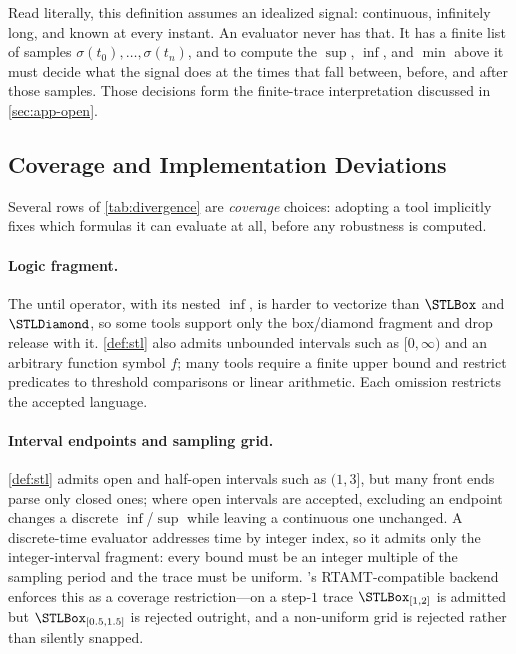 Read literally, this definition assumes an idealized signal: continuous,
infinitely long, and known at every instant. An evaluator never has that. It
has a finite list of samples $\sigma(t_0), \dots, \sigma(t_n)$, and to compute the
$\sup$, $\inf$, and $\min$ above it must decide what the signal does at the
times that fall between, before, and after those samples. Those decisions
form the finite-trace interpretation discussed in \cref{sec:app-open}.

\subsection{Coverage and Implementation Deviations}
\label{sec:app-corner}

Several rows of \cref{tab:divergence} are \emph{coverage} choices: adopting a
tool implicitly fixes which formulas it can evaluate at all, before any
robustness is computed.

\paragraph{Logic fragment.}
The until operator, with its nested $\inf$, is harder to vectorize than $\Always$
and $\Eventually$, so some tools support only the box/diamond fragment and drop
release with it. \cref{def:stl} also admits unbounded intervals such as
$[0,\infty)$ and an arbitrary function symbol $f$; many tools require a finite
upper bound and restrict predicates to threshold comparisons or linear
arithmetic. Each omission restricts the accepted language.

\paragraph{Interval endpoints and sampling grid.}
\cref{def:stl} admits open and half-open intervals such as $(1,3]$, but many
front ends parse only closed ones; where open intervals are accepted, excluding
an endpoint changes a discrete $\inf$/$\sup$ while leaving a continuous one
unchanged. A discrete-time evaluator addresses time by integer index, so it
admits only the integer-interval fragment: every bound must be an integer
multiple of the sampling period and the trace must be uniform. \tool's
RTAMT-compatible backend enforces this as a coverage restriction---on a
step-$1$ trace $\Always_{[1,2]}$ is admitted but $\Always_{[0.5,1.5]}$ is rejected
outright, and a non-uniform grid is rejected rather than silently snapped.

